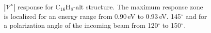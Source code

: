 \documentclass[prb,11pt,tightenlines,twocolumn,aps]{revtex4-1}
\begin{document}
\begin{figure}[tb]
    \centering
    \\
    \caption{$|\mathcal{V}^{\mathrm{x}}|$ response for C$_{16}$H$_{8}$-alt
    structure. The maximum response zone is localized for an energy range from
    0.90\,eV to 0.93\,eV. 145$^{\circ}$ and for a polarization angle of the
    incoming beam from 120$^{\circ}$ to 150$^{\circ}$.}
    \label{fig:alt-vab-mag}
\end{figure}
\end{document}
